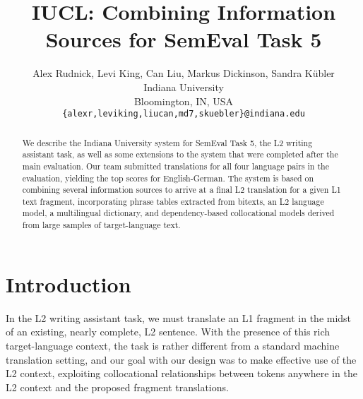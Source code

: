 \documentclass[11pt]{article}
\title{IUCL: Combining Information Sources for SemEval Task 5}
\author{Alex Rudnick, Levi King, Can Liu, Markus Dickinson, Sandra K\"ubler  \\
  Indiana University \\
  Bloomington, IN, USA \\
  {\tt \{alexr,leviking,liucan,md7,skuebler\}@indiana.edu} }
\date{}
\begin{document}
\maketitle
\begin{abstract}
We describe the Indiana University system for SemEval Task 5, the L2
writing assistant task, as well as some extensions to the system that were
completed after the main evaluation. Our team submitted translations for all
four language pairs in the evaluation, yielding the top scores for
English-German.  The system is based on combining several information sources
to arrive at a final L2 translation for a given L1 text fragment, incorporating
phrase tables extracted from bitexts, an L2 language model, a multilingual
dictionary, and dependency-based collocational models derived from large
samples of target-language text.
\end{abstract}


\section{Introduction}


In the L2 writing assistant task, we must translate an L1 fragment in the midst of an existing,
nearly complete, L2 sentence.  With the presence of this rich target-language
context, the task is rather different from a standard machine translation
setting, and our goal with our design was to make effective use of the L2
context, exploiting collocational relationships between tokens anywhere in the
L2 context and the proposed fragment translations.
\end{document}
